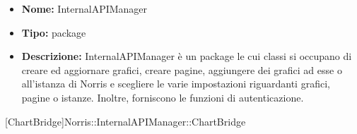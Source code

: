 			\begin{itemize}
			\item \textbf{Nome:} InternalAPIManager
			\item \textbf{Tipo:} package
			
			\item \textbf{Descrizione:} InternalAPIManager è un package le cui classi si occupano di creare ed aggiornare grafici, creare pagine, aggiungere dei grafici ad esse o all'istanza di Norris e scegliere le varie impostazioni riguardanti grafici, pagine o istanze. Inoltre, forniscono le funzioni di autenticazione.
			\end{itemize}

			
			[ChartBridge]{Norris::InternalAPIManager::ChartBridge}
			

	
